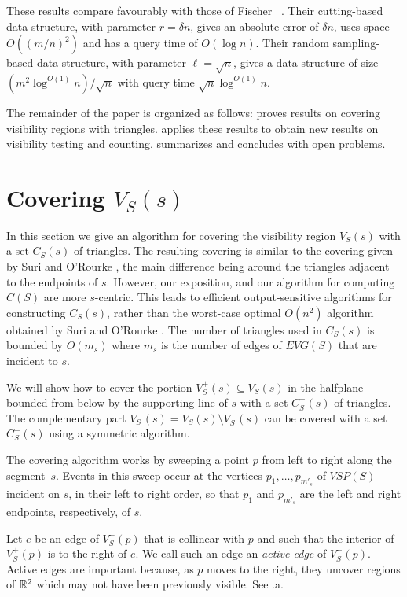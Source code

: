 \documentclass{patmorin}
\newcommand{\EVG}{\mathit{EVG}}
\newcommand{\VSP}{\mathit{VSP}}
\begin{document}
These results compare favourably with those of Fischer \etal\
\cite{fhjmz08,fhjmz09}.  Their cutting-based data structure, with
parameter $r=\delta n$, gives an absolute error of $\delta n$, uses
space $O((m/n)^2)$ and has a query time of $O(\log n)$.  Their random
sampling-based data structure, with parameter $\ell=\sqrt{n}$, gives
a data structure of size $(m^2\log^{O(1)} n)/\sqrt{n}$ with query time
$\sqrt{n}\log^{O(1)} n$.


The remainder of the paper is organized as follows:  
proves results on covering visibility regions with triangles.
 applies these results to obtain new results on
visibility testing and counting. \Secref{conclusions} summarizes and
concludes with open problems.

\section{Covering $V_S(s)$}

In this section we give an algorithm for covering the visibility region
$V_S(s)$ with a set $C_S(s)$ of triangles.  The resulting covering is
similar to the covering given by Suri and O'Rourke \cite{so84}, the main
difference being around the triangles adjacent to the endpoints of $s$.
However, our exposition, and our algorithm for computing $C(S)$ are more
$s$-centric.  This leads to efficient output-sensitive algorithms for
constructing $C_S(s)$, rather than the worst-case optimal $O(n^2)$
algorithm obtained by Suri and O'Rourke \cite{so84}.
The number of triangles used in $C_S(s)$ is bounded by $O(m_s)$ where
$m_s$ is the number of edges of $\EVG(S)$ that are incident to $s$.

We will show how to cover the portion $V^+_S(s)\subseteq V_S(s)$ in the
halfplane bounded from below by the supporting line of $s$ with a set
$C^+_S(s)$ of triangles.  The complementary part $V^-_S(s)=V_S(s)\setminus
V^+_S(s)$ can be covered with a set $C^-_S(s)$ using a symmetric algorithm.

The covering algorithm works by sweeping a point $p$ from left to right
along the segment~$s$.  Events in this sweep occur at the vertices
$p_1,\ldots,p_{m'_s}$ of $\VSP(S)$ incident on $s$, in their left to right
order, so that $p_1$ and $p_{m'_s}$ are the left and right endpoints,
respectively, of $s$. %

Let $e$ be an edge of $V^+_S(p)$ that is collinear with $p$ and such that the
interior of $V^+_S(p)$ is to the right of $e$. We call such an edge an
\emph{active edge} of $V^+_S(p)$.  Active edges are important because, as $p$
moves to the right, they uncover regions of $\mathbb{R}^2$ which may not have been
previously visible.  See \figref{alg}.a.
\end{document}
